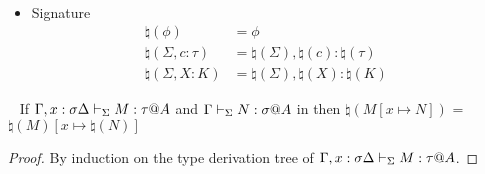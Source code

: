 \begin{dfn}
\begin{multicols}{2}
\begin{itemize}
\begin{align*}
            \end{align*}
        \item Signature
            \begin{align*}
                \natural(\phi) &= \phi & \\
                \natural(\Sigma, c:\tau) &= \natural(\Sigma),\natural(c):\natural(\tau) & \\
                \natural(\Sigma, X:K) &= \natural(\Sigma), \natural(X):\natural(K) &
            \end{align*}
    \end{itemize}
    \end{multicols}
\end{dfn}

\begin{lemma}\
    \label{lemma:SubstitutionAndNatural}
    If \( \G, x:\sigma \D \V M:\tau@A \) and \( \G \V N:\sigma@A\) in \LMD
    then $\natural(M[x \mapsto N])$ = $\natural(M)[x\mapsto\natural(N)]$
\end{lemma}

\begin{proof}
    By induction on the type derivation tree of $\G, x:\sigma \D \V M:\tau@A$.
\end{proof}

